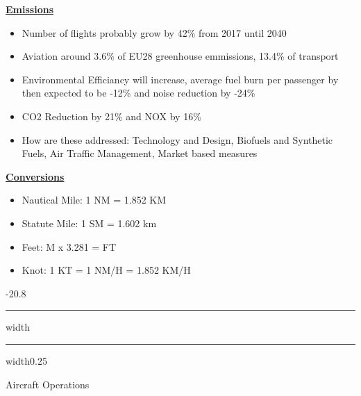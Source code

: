 \documentclass[9pt, landscape, fleqn]{scrartcl}
\makeatletter
\renewcommand{\section}{\@startsection{section}{1}{0mm}%
{-2\baselineskip}{0.8\baselineskip}%
{\hrule depth 0.2pt width\columnwidth\hrule depth1.5pt
width0.25\columnwidth\vspace*{1.2em}\Large\bfseries\rmfamily}}
\makeatother
\begin{document}
\begin{multicols*}{3}
\underline{\textbf{Emissions}}
\begin{itemize}
    \item Number of flights probably grow by 42\% from 2017 until 2040
    \item Aviation around 3.6\% of EU28 greenhouse emmissions, 13.4\% of transport
    \item Environmental Efficiancy will increase, average fuel burn per passenger by then expected to be -12\% and noise reduction by -24\%
    \item CO2 Reduction by 21\% and NOX by 16\%
    \item How are these addressed: Technology and Design, Biofuels and Synthetic Fuels, Air Traffic Management, Market based measures
\end{itemize}
\underline{\textbf{Conversions}}
\begin{itemize}
    \item Nautical Mile: 1 NM = 1.852 KM 
    \item Statute Mile: 1 SM = 1.602 km
    \item Feet: M x 3.281 = FT 
    \item Knot: 1 KT = 1 NM/H = 1.852 KM/H
\end{itemize}
\section{Aircraft Operations}

\end{multicols*}
\end{document}

